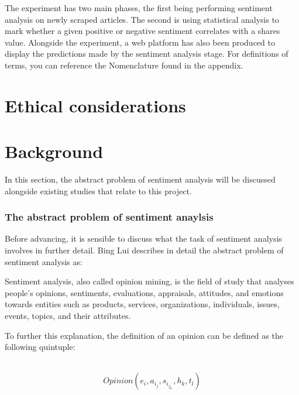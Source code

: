 \documentclass[a4paper,11pt]{report}
\begin{document}
The experiment has two main phases, the first being performing sentiment analysis on newly scraped articles. The second is using statistical analysis to mark whether a given positive or negative sentiment correlates with a shares value. Alongside the experiment, a web platform has also been produced to display the predictions made by the sentiment analysis stage. For definitions of terms, you can reference the Nomenclature found in the appendix.

\chapter{Ethical considerations}
\label{chap:ethical-con}

\chapter{Background}
\label{chap:background}

In this section, the abstract problem of sentiment analysis will be discussed alongside existing studies that relate to this project.

\subsection{The abstract problem of sentiment anaylsis}
Before advancing, it is sensible to discuss what the task of sentiment analysis involves in further detail. Bing Lui describes in detail the abstract problem of sentiment analysis as:

\begin{displayquote}
Sentiment analysis, also called opinion mining, is the field of study that analyses people’s opinions, sentiments, evaluations, appraisals, attitudes, and emotions towards entities such as products, services, organizations, individuals, issues, events, topics, and their attributes.
\end{displayquote}


To further this explanation, the definition of an opinion can be defined as the following quintuple:

\\\[Opinion (e_i, a_i_j, s_i_j_k_l, h_k, t_l)\]
\end{document}
